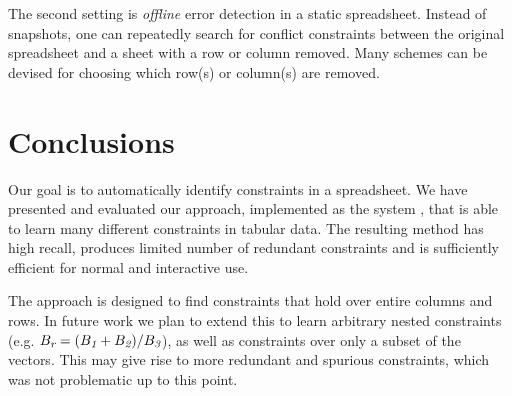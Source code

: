 The second setting is \textit{offline} error detection in a static spreadsheet.
Instead of snapshots, one can repeatedly search for conflict constraints between the original spreadsheet and a sheet with a row or column removed. Many schemes can be devised for choosing which row(s) or column(s) are removed.


\section{Conclusions}\label{sec:conclusions}

Our goal is to automatically identify constraints in a spreadsheet.
We have presented and evaluated our approach, implemented as the system \sname, that is able to learn many different constraints in tabular data.
The resulting method has high recall, produces limited number of redundant constraints and is sufficiently efficient for normal and interactive use.

The approach is designed to find constraints that hold over entire columns and rows. In future work we plan to extend this to learn arbitrary nested constraints (e.g. $B_{\textit{r}} = (B_{\textit{1}} + B_{\textit{2}}) / B_{\textit{3}}$), as well as constraints over only a subset of the vectors. This may give rise to more redundant and spurious constraints, which was not problematic up to this point.

